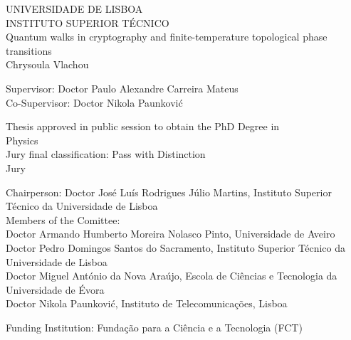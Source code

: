 \begin{center}
\vspace{0.5cm}
{\FontLb UNIVERSIDADE DE LISBOA} \\
\vspace{0.2cm}
{\FontLb INSTITUTO SUPERIOR T\'{E}CNICO} \\
\vspace{1.0cm}
{\FontHb 
Quantum walks in cryptography and finite-temperature topological phase transitions} \\

\vspace{1.5cm}
{\FontLn Chrysoula Vlachou} \\
\vspace{1.5cm}

\end{center}
\begin{flushleft}
{\FontMb Supervisor: \FontMn \qquad Doctor Paulo Alexandre Carreira Mateus} \\
{\FontMb Co-Supervisor: \FontMn \hspace{.0em} Doctor Nikola Paunkovi\'c} \\

\vspace{1cm}
\end{flushleft}
\begin{center}
{\FontMn Thesis approved in public session to obtain the PhD Degree in\\ Physics} \\
\vspace{0.5cm}
{\FontMb Jury final classification:} Pass with Distinction \\
\vspace{0.5cm}
{\FontMb Jury}\\
\end{center}
\vspace{0.5cm}
\begin{flushleft}
{\FontMb Chairperson:} Doctor Jos\'e Lu\'is Rodrigues J\'ulio Martins, Instituto Superior T\'ecnico da Universidade de Lisboa  \\
{\FontMb Members of the Comittee:}\\
Doctor Armando Humberto Moreira Nolasco Pinto, Universidade de Aveiro\\
Doctor Pedro Domingos Santos do Sacramento, Instituto Superior T\'ecnico da Universidade de Lisboa\\
Doctor Miguel Ant\'onio da Nova Ara\'ujo, Escola de Ci\^encias e Tecnologia da Universidade de \'Evora\\
Doctor Nikola Paunkovi\'c, Instituto de Telecomunica\c c\~oes, Lisboa
\vspace{1cm}

{\FontMb Funding Institution:} Funda\c c\~ao para a Ci\^encia e a Tecnologia (FCT)\end{flushleft}
\vfill \begin{center} {}
\end{center}
%